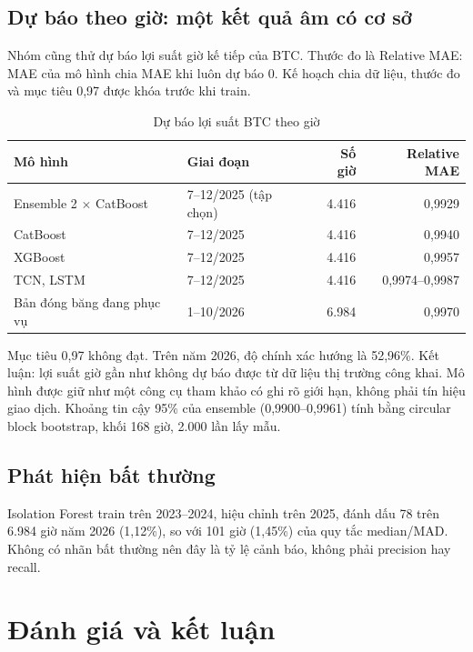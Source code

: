 \documentclass[11pt,a4paper]{article}
\begin{document}
\subsection{Dự báo theo giờ: một kết quả âm có cơ sở}
Nhóm cũng thử dự báo lợi suất giờ kế tiếp của BTC. Thước đo là Relative MAE: MAE của mô hình chia
MAE khi luôn dự báo 0. Kế hoạch chia dữ liệu, thước đo và mục tiêu 0,97 được khóa trước khi train.

\begin{table}[H]
\centering\small
\begin{tabular}{llrr}
\toprule
\textbf{Mô hình} & \textbf{Giai đoạn} & \textbf{Số giờ} & \textbf{Relative MAE} \\
\midrule
Ensemble 2 $\times$ CatBoost & 7--12/2025 (tập chọn) & 4.416 & 0,9929 \\
CatBoost & 7--12/2025 & 4.416 & 0,9940 \\
XGBoost & 7--12/2025 & 4.416 & 0,9957 \\
TCN, LSTM & 7--12/2025 & 4.416 & 0,9974--0,9987 \\
Bản đóng băng đang phục vụ & 1--10/2026 & 6.984 & 0,9970 \\
\bottomrule
\end{tabular}
\caption{Dự báo lợi suất BTC theo giờ}
\end{table}

Mục tiêu 0,97 không đạt. Trên năm 2026, độ chính xác hướng là 52,96\%. Kết luận: lợi suất giờ gần
như không dự báo được từ dữ liệu thị trường công khai. Mô hình được giữ như một công cụ tham khảo
có ghi rõ giới hạn, không phải tín hiệu giao dịch. Khoảng tin cậy 95\% của ensemble (0,9900--0,9961)
tính bằng circular block bootstrap, khối 168 giờ, 2.000 lần lấy mẫu.

\subsection{Phát hiện bất thường}
Isolation Forest train trên 2023--2024, hiệu chỉnh trên 2025, đánh dấu 78 trên 6.984 giờ năm 2026
(1,12\%), so với 101 giờ (1,45\%) của quy tắc median/MAD. Không có nhãn bất thường nên đây là tỷ lệ
cảnh báo, không phải precision hay recall.


\section{Đánh giá và kết luận}\label{sec:eval}
\end{document}

